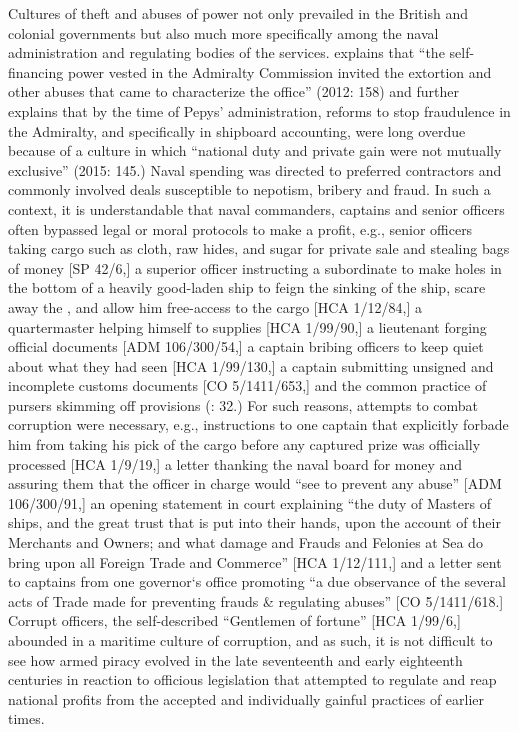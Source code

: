 Cultures of theft and abuses of power not only prevailed in the British and colonial governments but also much more specifically among the naval administration and regulating bodies of the  services. \citeauthor{Bicheno2012} explains that “the self-financing power vested in the Admiralty Commission invited the extortion and other abuses that came to characterize the office” (2012: 158) and \citeauthor{Lincoln2015} further explains that by the time of Pepys’ administration, reforms to stop fraudulence in the Admiralty, and specifically in shipboard accounting, were long overdue because of a culture in which “national duty and private gain were not mutually exclusive” (2015: 145.) Naval spending was directed to preferred contractors and commonly involved deals susceptible to nepotism, bribery and fraud. In such a context, it is understandable that naval commanders, captains and senior officers often bypassed legal or moral protocols to make a profit, e.g., senior officers taking cargo such as cloth, raw hides, and sugar for private sale and stealing bags of money [SP 42/6,] a superior officer instructing a subordinate to make holes in the bottom of a heavily good-laden ship to feign the sinking of the ship, scare away the , and allow him free-access to the cargo [HCA 1/12/84,] a quartermaster helping himself to  supplies [HCA 1/99/90,] a lieutenant forging official documents [ADM 106/300/54,] a captain bribing officers to keep quiet about what they had seen [HCA 1/99/130,] a captain submitting unsigned and incomplete customs documents [CO 5/1411/653,] and the common practice of pursers skimming off provisions (\citealt{AdkinsAdkins2008}: 32.)  For such reasons, attempts to combat corruption were necessary, e.g., instructions to one captain that explicitly forbade him from taking his pick of the cargo before any captured prize was officially processed [HCA 1/9/19,] a letter thanking the naval board for money and assuring them that the officer in charge would “see to prevent any abuse” [ADM 106/300/91,] an opening statement in court explaining “the duty of Masters of ships, and the great trust that is put into their hands, upon the account of their Merchants and Owners; and what damage and Frauds and Felonies at Sea do bring upon all Foreign Trade and Commerce” [HCA 1/12/111,] and a letter sent to captains from one governor‘s office promoting “a due observance of the several acts of Trade made for preventing frauds \& regulating abuses” [CO 5/1411/618.] Corrupt officers, the self-described “Gentlemen of fortune” [HCA 1/99/6,] abounded in a maritime culture of corruption, and as such, it is not difficult to see how armed piracy evolved in the late seventeenth and early eighteenth centuries in reaction to officious legislation that attempted to regulate and reap national profits from the accepted and individually gainful practices of earlier times. 

